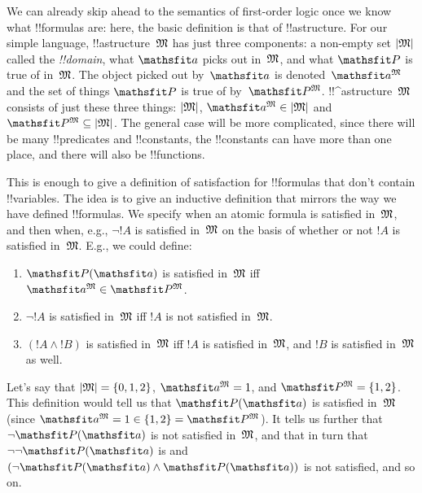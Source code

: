 \documentclass[../../../include/open-logic-section]{subfiles}
\begin{document}


We can already skip ahead to the semantics of first-order logic once
we know what !!{formula}s are: here, the basic definition is that of 
!!a{structure}. For our simple language, !!a{structure}~$\Struct M$ has
just three components: a non-empty set $\Domain{M}$ called the
\emph{!!{domain}}, what $\Obj a$ picks out in~$\Struct M$, and what
$\Obj P$ is true of in~$\Struct M$.  The object picked out by~$\Obj a$
is denoted~$\Assign{\Obj a}{M}$ and the set of things $\Obj P$ is true
of by~$\Assign{\Obj P}{M}$. !!^a{structure}~$\Struct{M}$ consists of
just these three things: $\Domain{M}$, $\Assign{\Obj a}{M} \in
\Domain{M}$ and $\Assign{\Obj P}{M} \subseteq \Domain{M}$. The general
case will be more complicated, since there will be many !!{predicate}s
and !!{constant}s, the !!{constant}s can have more than one place, and
there will also be !!{function}s.

This is enough to give a definition of satisfaction for !!{formula}s
that don't contain !!{variable}s.  The idea is to give an inductive
definition that mirrors the way we have defined !!{formula}s. We
specify when an atomic formula is satisfied in~$\Struct{M}$, and then
when, e.g., $\lnot !A$ is satisfied in~$\Struct{M}$ on the basis of
whether or not $!A$ is satisfied in~$\Struct{M}$. E.g., we could
define:
\begin{enumerate}
  \item $\Atom{\Obj P}{\Obj a}$ is satisfied in~$\Struct{M}$ iff
  $\Assign{\Obj a}{M} \in \Assign{\Obj P}{M}$.
  \item $\lnot !A$ is satisfied in~$\Struct{M}$ iff $!A$ is not
  satisfied in~$\Struct{M}$.
  \item $(!A \land !B)$ is satisfied in~$\Struct{M}$ iff $!A$ is
  satisfied in~$\Struct{M}$, and $!B$ is satisfied in~$\Struct{M}$ as
  well.
\end{enumerate}
Let's say that $\Domain{M} = \{0, 1, 2\}$, $\Assign{\Obj a}{M} = 1$,
and $\Assign{\Obj P}{M} = \{1, 2\}$. This definition would tell us
that $\Atom{\Obj P}{\Obj a}$ is satisfied in~$\Struct{M}$ (since
$\Assign{\Obj a}{M} =  1 \in \{1,2\} = \Assign{\Obj P}{M}$). It tells
us further that $\lnot \Atom{\Obj P}{\Obj a}$ is not satisfied
in~$\Struct{M}$, and that in turn that $\lnot\lnot \Atom{\Obj P}{\Obj
a}$ is and $(\lnot \Atom{\Obj P}{\Obj a} \land \Atom{\Obj P}{\Obj a})$
is not satisfied, and so on.
\end{document}
